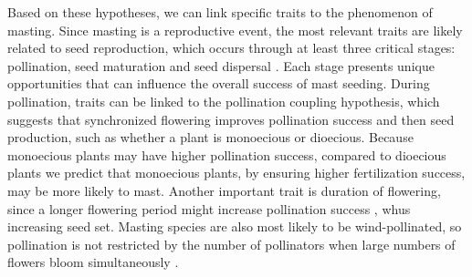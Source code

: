 \documentclass[11pt,letter]{article}
\begin{document}
Based on these hypotheses, we can link specific traits to the phenomenon of masting. Since masting is a reproductive event, the most relevant traits are likely related to seed reproduction, which occurs through at least three critical stages: pollination, seed maturation and seed dispersal \citep{satake2021studying}. Each stage presents unique opportunities that can influence the overall success of mast seeding. During pollination, traits can be linked to the pollination coupling hypothesis, which suggests that synchronized flowering improves pollination success and then seed production, such as whether a plant is monoecious or dioecious. Because monoecious plants may have higher pollination success, compared to dioecious plants  \citep[where separate genders for each individual plant may reduce pollination success in low-density populations,][]{bawa1980evolution} we predict that monoecious plants, by ensuring higher fertilization success, may be more likely to mast. Another important trait is duration of flowering, since a longer flowering period might increase pollination success \citep{knight2005pollen}, whus increasing seed set. Masting species are also most likely to be wind-pollinated, so pollination is not restricted by the number of pollinators when large numbers of flowers bloom simultaneously \citep{bogdziewicz2017masting, bogdziewicz2020flowering}.\par
\end{document}

